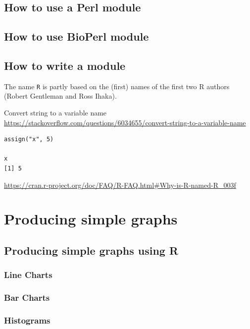 \documentclass[]{book}
\theoremstyle{definition}
\theoremstyle{definition}
\theoremstyle{definition}
\theoremstyle{remark}
\begin{document}
\section{How to use a Perl module}\label{how-to-use-a-perl-module}

\section{How to use BioPerl module}\label{how-to-use-bioperl-module}

\section{How to write a module}\label{how-to-write-a-module}

The name \texttt{R} is partly based on the (first) names of the first
two R authors (Robert Gentleman and Ross Ihaka).

Convert string to a variable name
\url{https://stackoverflow.com/questions/6034655/convert-string-to-a-variable-name}

\begin{verbatim}
assign("x", 5)

x
[1] 5
\end{verbatim}

\url{https://cran.r-project.org/doc/FAQ/R-FAQ.html\#Why-is-R-named-R_003f}

\chapter{Producing simple graphs}\label{producing-simple-graphs}

\section{Producing simple graphs using
R}\label{producing-simple-graphs-using-r}

\subsection{Line Charts}\label{line-charts}

\subsection{Bar Charts}\label{bar-charts}

\subsection{Histograms}\label{histograms}
\end{document}
